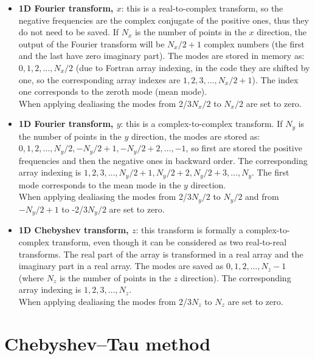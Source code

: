 \begin{itemize}
\item \textbf{1D Fourier transform, $x$}: this is a real-to-complex transform, so the negative frequencies are the complex conjugate of the positive ones, thus they do not need to be saved. If $N_x$ is the number of points in the $x$ direction, the output of the Fourier transform will be $N_x/2+1$ complex numbers (the first and the last have zero imaginary part). The modes are stored in memory as: $0,1,2,\dots,N_x/2$ (due to Fortran array indexing, in the code they are shifted by one, so the corresponding array indexes are $1,2,3,\dots,N_x/2+1$). The index one corresponds to the zeroth mode (mean mode).\\
When applying dealiasing the modes from 2/3$N_x/2$ to $N_x/2$ are set to zero.
\item \textbf{1D Fourier transform, $y$}: this is a complex-to-complex transform. If $N_y$ is the number of points in the $y$ direction, the modes are stored as: $0,1,2,\dots,N_y/2,-N_y/2+1,-N_y/2+2,\dots,-1$, so first are stored the positive frequencies and then the negative ones in backward order. The corresponding array indexing is $1,2,3,\dots,N_y/2+1,N_y/2+2,N_y/2+3,\dots,N_y$. The first mode corresponds to the mean mode in the $y$ direction.\\
When applying dealiasing the modes from 2/3$N_y/2$ to $N_y/2$ and from $-N_y/2+1$ to -2/3$N_y/2$ are set to zero.
\item \textbf{1D Chebyshev transform, $z$}: this transform is formally a complex-to-complex transform, even though it can be considered as two real-to-real transforms. The real part of the array is transformed in a real array and the imaginary part in a real array. The modes are saved as $0,1,2,\dots,N_z-1$ (where $N_z$ is the number of points in the $z$ direction). The corresponding array indexing is $1,2,3,\dots,N_z$.\\
When applying dealiasing the modes from 2/3$N_z$ to $N_z$ are set to zero.
\end{itemize}

\section{Chebyshev--Tau method}
\label{sec: chebtau}
